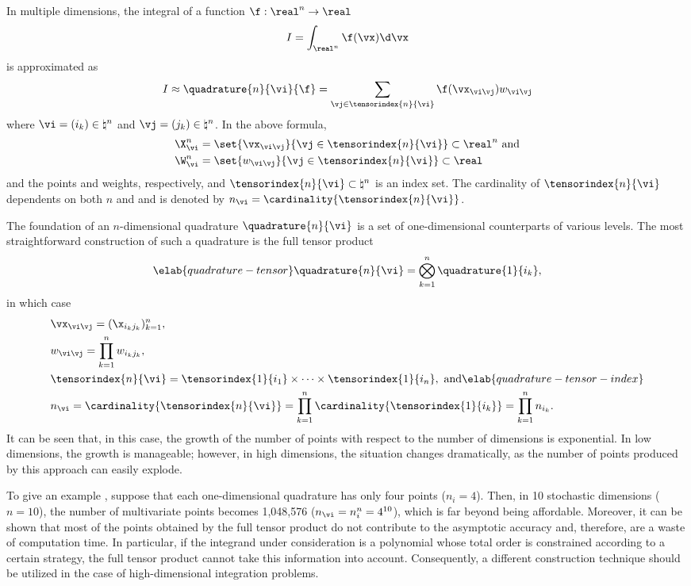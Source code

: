 In multiple dimensions, the integral of a function $\f: \real^n \to \real$
\[
  I = \int_{\real^n} \f(\vx) \d \vx
\]
is approximated as
\[
  I \approx \quadrature{n}{\vi}{\f}
  = \sum_{\vj \in \tensorindex{n}{\vi}} \f(\vx_{\vi \vj}) w_{\vi \vj}
\]
where $\vi = (i_k) \in \natural^n$ and $\vj = (j_k) \in \natural^n$. In the
above formula,
\begin{align*}
  & \X^n_{\vi} = \set{\vx_{\vi \vj}}{\vj \in \tensorindex{n}{\vi}} \subset \real^n \text{ and} \\
  & \W^n_{\vi} = \set{w_{\vi \vj}}{\vj \in \tensorindex{n}{\vi}} \subset \real
\end{align*}
and the points and weights, respectively, and $\tensorindex{n}{\vi} \subset
\natural^n$ is an index set. The cardinality of $\tensorindex{n}{\vi}$
dependents on both $n$ and \vi and is denoted by $n_{\vi} =
\cardinality{\tensorindex{n}{\vi}}$.

The foundation of an $n$-dimensional quadrature $\quadrature{n}{\vi}$ is a set
of one-dimensional counterparts of various levels. The most straightforward
construction of such a quadrature is the full tensor product
\begin{equation} \elab{quadrature-tensor}
  \quadrature{n}{\vi} = \bigotimes_{k = 1}^n \quadrature{1}{i_k},
\end{equation}
in which case
\begin{align}
  & \vx_{\vi \vj} = (\x_{i_k j_k})_{k = 1}^n, \nonumber \\
  & w_{\vi \vj} = \prod_{k = 1}^n w_{i_k j_k}, \nonumber \\
  & \tensorindex{n}{\vi}
  = \tensorindex{1}{i_1} \times \cdots \times \tensorindex{1}{i_n}, \text{ and} \elab{quadrature-tensor-index} \\
  & n_{\vi}
  = \cardinality{\tensorindex{n}{\vi}}
  = \prod_{k = 1}^n \cardinality{\tensorindex{1}{i_k}}
  = \prod_{k = 1}^n n_{i_k}. \nonumber
\end{align}
It can be seen that, in this case, the growth of the number of points with
respect to the number of dimensions is exponential. In low dimensions, the
growth is manageable; however, in high dimensions, the situation changes
dramatically, as the number of points produced by this approach can easily
explode.

To give an example \cite{heiss2008}, suppose that each one-dimensional
quadrature has only four points ($n_i = 4$). Then, in 10 stochastic dimensions
($n = 10$), the number of multivariate points becomes 1,048,576 ($n_{\vi} =
n_i^n = 4^{10}$), which is far beyond being affordable. Moreover, it can be
shown that most of the points obtained by the full tensor product do not
contribute to the asymptotic accuracy and, therefore, are a waste of computation
time. In particular, if the integrand under consideration is a polynomial whose
total order is constrained according to a certain strategy, the full tensor
product cannot take this information into account. Consequently, a different
construction technique should be utilized in the case of high-dimensional
integration problems.

